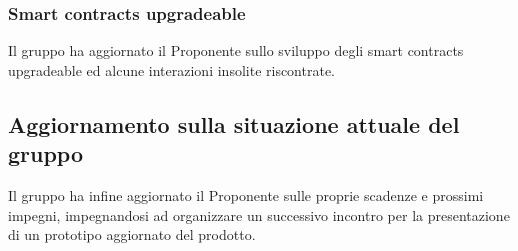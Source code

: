 \subsubsection*{Smart contracts upgradeable}
Il gruppo ha aggiornato il Proponente sullo sviluppo degli smart contracts upgradeable ed alcune interazioni insolite riscontrate.

\subsection{Aggiornamento sulla situazione attuale del gruppo}
Il gruppo ha infine aggiornato il Proponente sulle proprie scadenze e prossimi impegni, impegnandosi ad organizzare un successivo incontro per la presentazione di un prototipo aggiornato del prodotto.